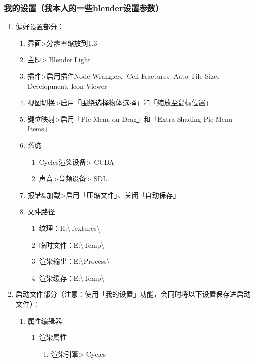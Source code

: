 \documentclass{../../PublicResources/DocClass}
\begin{document}
\newpage
\subsubsection{我的设置（我本人的一些blender设置参数）}
\hypertarget{MySettings}{}
\begin{enumerate}
    \item 偏好设置部分：
    \begin{enumerate}
        \item 界面>分辨率缩放到1.3
        \item 主题> Blender Light
        \item 插件>启用插件Node Wrangler、Cell Fracture、Auto Tile Size、Development: Icon Viewer
        \item 视图切换>启用「围绕选择物体选择」和「缩放至鼠标位置」
        \item 键位映射>启用「Pie Menu on Drag」和「Extra Shading Pie Menu Items」
        \item 系统
        \begin{enumerate}
            \item Cycles渲染设备> CUDA
            \item 声音>音频设备> SDL
        \end{enumerate}
        \item 报错\&加载>启用「压缩文件」、关闭「自动保存」
        \item 文件路径
        \begin{enumerate}
            \item 纹理：H:\textbackslash Textures\textbackslash
            \item 临时文件：E:\textbackslash Temp\textbackslash
            \item 渲染输出：E:\textbackslash Process\textbackslash
            \item 渲染缓存：E:\textbackslash Temp\textbackslash
        \end{enumerate}
    \end{enumerate}
    \item 启动文件部分（注意：使用「我的设置」功能，会同时将以下设置保存进启动文件）：
    \begin{enumerate}
        \item 属性编辑器
        \begin{enumerate}
            \item 渲染属性
            \begin{enumerate}
                \item 渲染引擎> Cycles

\end{enumerate}
\end{enumerate}
\end{enumerate}
\end{enumerate}
\end{document}
